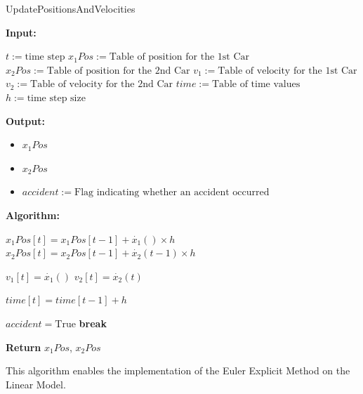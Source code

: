 \documentclass{article}
\begin{document}
			
			
			\begin{algorithm}[H]
				\caption{UpdatePositionsAndVelocities}\label{alg:update_positions}
				\begin{algorithmic}
					\State \textbf{Input:} \\
					\begin{itemize}
						\State $t:=\text{time step}$
						\State $x_1Pos:=\text{Table of position for the 1st Car}$
						\State $x_2Pos:=\text{Table of position for the 2nd Car}$
						\State $v_1:=\text{Table of velocity for the 1st Car}$
						\State $v_2:=\text{Table of velocity for the 2nd Car}$
						\State $time:=\text{Table of time values}$
						\State $h:=\text{time step size}$
					\end{itemize}
					\State \textbf{Output:} \\
					\begin{itemize}
						\item $x_1Pos$ 
						\item $x_2Pos$
					\end{itemize}
					\begin{itemize}[]
						\item $accident:=\text{Flag indicating whether an accident occurred}$
					\end{itemize}
					\State \textbf{Algorithm:} \\
					\begin{itemize}[]
						\State $x_1Pos[t] = x_1Pos[t-1] + \dot{x_1}() \times h$
						\State $x_2Pos[t] = x_2Pos[t-1] + \dot{x_2}(t-1) \times h$
						
						\State $v_1[t] = \dot{x_1}()$
						\State $v_2[t] = \dot{x_2}(t)$
						
						\State $time[t] = time[t-1] + h$
						
						\State $accident = \text{True}$
						\State \textbf{break}
						\EndIf
						\EndFor
					\end{itemize}
					\State \textbf{Return} $x_1Pos$, $x_2Pos$
				\end{algorithmic}
			\end{algorithm}
			This algorithm enables the implementation of the Euler Explicit Method on the Linear Model.
			
			
\end{document}
